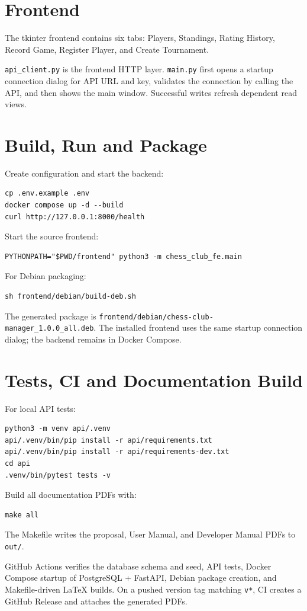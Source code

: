 \documentclass[11pt,a4paper]{article}
\begin{document}
\section{Frontend}
The tkinter frontend contains six tabs: Players, Standings, Rating History, Record Game, Register Player, and Create Tournament.

\texttt{api\_client.py} is the frontend HTTP layer. \texttt{main.py} first opens a startup connection dialog for API URL and key, validates the connection by calling the API, and then shows the main window. Successful writes refresh dependent read views.

\section{Build, Run and Package}
Create configuration and start the backend:
\begin{verbatim}
cp .env.example .env
docker compose up -d --build
curl http://127.0.0.1:8000/health
\end{verbatim}
Start the source frontend:
\begin{verbatim}
PYTHONPATH="$PWD/frontend" python3 -m chess_club_fe.main
\end{verbatim}
For Debian packaging:
\begin{verbatim}
sh frontend/debian/build-deb.sh
\end{verbatim}
The generated package is \texttt{frontend/debian/chess-club-manager\_1.0.0\_all.deb}. The installed frontend uses the same startup connection dialog; the backend remains in Docker Compose.

\section{Tests, CI and Documentation Build}
For local API tests:
\begin{verbatim}
python3 -m venv api/.venv
api/.venv/bin/pip install -r api/requirements.txt
api/.venv/bin/pip install -r api/requirements-dev.txt
cd api
.venv/bin/pytest tests -v
\end{verbatim}
Build all documentation PDFs with:
\begin{verbatim}
make all
\end{verbatim}
The Makefile writes the proposal, User Manual, and Developer Manual PDFs to \texttt{out/}.

GitHub Actions verifies the database schema and seed, API tests, Docker Compose startup of PostgreSQL + FastAPI, Debian package creation, and Makefile-driven LaTeX builds. On a pushed version tag matching \texttt{v*}, CI creates a GitHub Release and attaches the generated PDFs.
\end{document}
